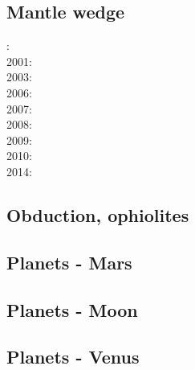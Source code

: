 \subsection*{Mantle wedge}

: \cite{tosl78}\\
2001: \cite{bigu01}\cite{haki01}\\
2003: \cite{vank03}\\
2006: \cite{gogc06}\cite{gecy06}\\
2007: \cite{gogc07}\\
2008: \cite{knva08}\cite{cage08}\\
2009: \cite{leki09}\\
2010: \cite{roms10}\cite{hogz10}\\
2014: \cite{ledg14}

\subsection*{Obduction, ophiolites}
 

\noindent
\cite{hack90}
\cite{hack91}
\cite{agzf14}

\subsection*{Planets - Mars}

\cite{scbg90}
\cite{nist01}
\cite{lenm04}
\cite{vavv05}
\cite{keta09}
\cite{gokg11}
\cite{ruts13}
\cite{seki14}
\cite{zhon16}

\subsection*{Planets - Moon}

\cite{zhdv19}

\subsection*{Planets - Venus}

\cite{scbg90}
\cite{kiha92}
\cite{somo96}
\cite{mazk98}\cite{moso98}
\cite{vavv05}
\cite{arta12}
\cite{gita14}
\cite{gery14b}
\cite{cram17}\cite{dast17}
\cite{king18}



